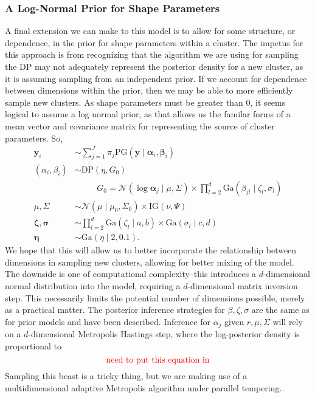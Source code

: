 \subsubsection{A Log-Normal Prior for Shape Parameters}
A final extension we can make to this model is to allow for some structure, or dependence, in the prior
  for shape parameters within a cluster.  The impetus for this approach is from recognizing that the
  algorithm we are using for sampling the DP may not adequately represent the posterior density for
  a new cluster, as it is assuming sampling from an independent prior.  If we account for dependence
  between dimensions within the prior, then we may be able to more efficiently sample new clusters.
  As shape parameters must be greater than 0, it seems logical to assume a log normal prior, as that
  allows us the familar forms of a mean vector and covariance matrix for representing the source of
  cluster parameters. So,
  \begin{equation}
    \label{eqn:dpln}
    \begin{aligned}
      \bm{ y}_i &\sim \sum_{j = 1}^J\pi_j\text{PG}\left(\bm{ y}\mid \bm{ \alpha}_i, \bm{ \beta}_i\right)\\
      (\alpha_i,\beta_i) &\sim \text{DP}\left(\eta, G_0\right)\\
        &~\hspace{1cm}G_0 = \mathcal{N}\left(\log\bm{ \alpha}_{j}\mid\mu,\Sigma\right)\times
            {\textstyle\prod}_{l = 2}^d\text{Ga}\left(\beta_{jl}\mid\zeta_l,\sigma_l\right)\\
      \mu,\Sigma &\sim \mathcal{N}\left(\mu\mid\mu_0,\Sigma_0\right) \times \text{IG}\left(\nu,\Psi\right)\\
      \bm{ \zeta},\bm{\sigma} &\sim {\textstyle\prod}_{l = 2}^d\text{Ga}(\zeta_l \mid a,b) \times \text{Ga}(\sigma_l \mid c,d) \\
      \bm{ \eta} &\sim \text{Ga}(\eta \mid 2, 0.1).
    \end{aligned}
  \end{equation}
  We hope that this will allow us to better incorporate the relationship between dimensions in
  sampling new clusters, allowing for better mixing of the model.  The downside is one of computational
  complexity--this introduces a $d$-dimensional normal distribution into the model, requiring a
  $d$-dimensional matrix inversion step.  This necessarily limits the potential number of dimensions
  possible, merely as a practical matter.  The posterior inference strategies for $\beta,\zeta,\sigma$
  are the same as for prior models and have been described.  Inference for $\alpha_j$ given
  $r, \mu,\Sigma$ will rely on a $d$-dimensional Metropolis Hastings step, where the log-posterior
  density is proportional to
  \begin{equation}
    \label{eqn:dplnlp}
    \text{{\color{red} need to put this equation in}}
  \end{equation}
  Sampling this beast is a tricky thing, but we are making use of a multidimensional adaptive Metropolis
  algorithm  under parallel
  tempering..

